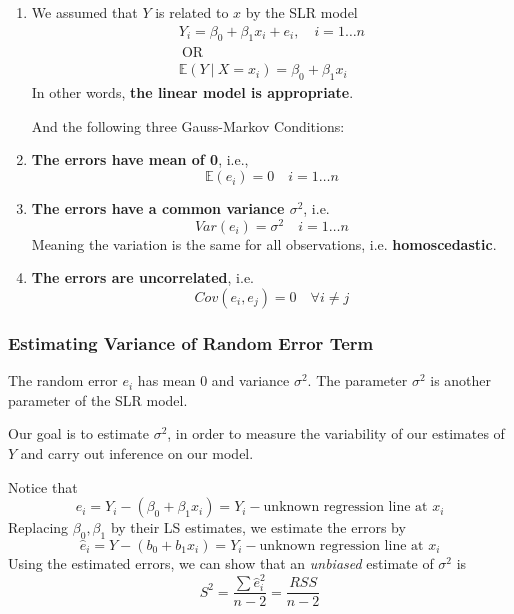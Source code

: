 \documentclass[11pt]{article}
\newcommand\op[1]{{\ \mathrm{#1}\ }}
\newcommand\OR{{\op{OR}}}
\theoremstyle{definition}
\numberwithin{equation}{section}
\begin{document}
\begin{enumerate}
  \item We assumed that $Y$ is related to $x$ by the SLR model
  \begin{gather*}
    Y_i = \beta_0 + \beta_1 x_i + e_i,\quad i = 1\dots n\\
    \OR\\
    \mathbb{E}(Y\>|\>X=x_i) = \beta_0 + \beta_1x_i
  \end{gather*}
  In other words, \textbf{the linear model is appropriate}.

  And the following three Gauss-Markov Conditions:
  \item \textbf{The errors have mean of 0}, i.e., 
  \begin{equation*}
    \mathbb{E}(e_i) = 0\quad i=1\dots n
  \end{equation*}
  \item \textbf{The errors have a common variance $\sigma^2$}, i.e.
  \begin{equation*}
    Var(e_i) = \sigma^2\quad i=1\dots n
  \end{equation*}
  Meaning the variation is the same for all observations, i.e. \textbf{homoscedastic}.
  \item \textbf{The errors are uncorrelated}, i.e. 
  \begin{equation*}
    Cov(e_i,e_j) = 0\quad \forall i\neq j
  \end{equation*}
\end{enumerate}

\subsubsection{Estimating Variance of Random Error Term}

The random error $e_i$ has mean $0$ and variance $\sigma^2$. The parameter $\sigma^2$ is another parameter of the SLR model. 

Our goal is to estimate $\sigma^2$, in order to measure the variability of our estimates of $Y$ and carry out inference on our model.

Notice that
\begin{equation}
  e_i = Y_i - (\beta_0 + \beta_1x_i) = Y_i - \text{unknown regression line at }x_i
\end{equation}
Replacing  $\beta_0,\beta_1$ by their LS estimates, we estimate the errors by
\begin{equation}
  \hat{e}_i = Y - (b_0 + b_1 x_i) = Y_i - \text{unknown regression line at }x_i
\end{equation}
Using the estimated errors, we can show that an \textit{unbiased} estimate of $\sigma^2$ is
\begin{equation}
  \boxed{S^2 = \frac{\sum \hat{e}_i^2}{n-2} = \frac{RSS}{n-2}}
\end{equation}
\end{document}
